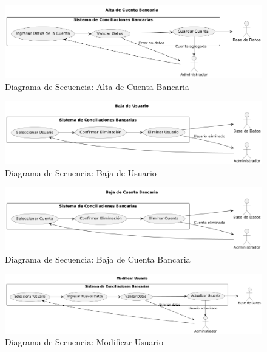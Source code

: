 \documentclass{article}
\begin{document}
\begin{figure}[H]
    \centering
    \includegraphics[width=\textwidth]{casos/AltaCuentaBancaria.png}
    \caption{Diagrama de Secuencia: Alta de Cuenta Bancaria}
\end{figure}

\begin{figure}[H]
    \centering
    \includegraphics[width=\textwidth]{casos/BajaUsuario.png}
    \caption{Diagrama de Secuencia: Baja de Usuario}
\end{figure}

\begin{figure}[H]
    \centering
    \includegraphics[width=\textwidth]{casos/BajaCuentaBancaria.png}
    \caption{Diagrama de Secuencia: Baja de Cuenta Bancaria}
\end{figure}

\begin{figure}[H]
    \centering
    \includegraphics[width=\textwidth]{casos/ModificarUsuario.png}
    \caption{Diagrama de Secuencia: Modificar Usuario}
\end{figure}
\end{document}
